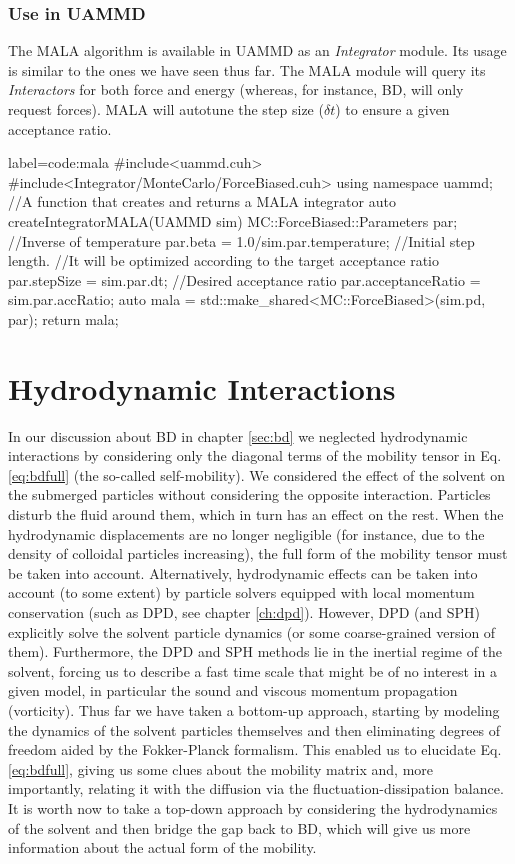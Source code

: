 \documentclass[ twoside,openright,titlepage,numbers=noenddot,%
headinclude,footinclude,cleardoublepage=empty,abstract=on,
BCOR=5mm,paper=b5,fontsize=11pt, dvipsnames
]{scrreprt}
\newcommand{\uammd}{\gls{UAMMD}\xspace}
\newcommand{\dt}{\delta t}
\begin{document}
\subsection*{Use in UAMMD}
The MALA algorithm is available in \uammd as an \emph{Integrator} module. Its usage is similar to the ones we have seen thus far. The MALA module will query its \emph{Interactors} for both force and energy (whereas, for instance, \gls{BD}, will only request forces).
MALA will autotune the step size ($\dt$) to ensure a given acceptance ratio.
\begin{code2}{label=code:mala}
#include<uammd.cuh>
#include<Integrator/MonteCarlo/ForceBiased.cuh>
using namespace uammd;
//A function that creates and returns a MALA integrator
auto createIntegratorMALA(UAMMD sim){   
  MC::ForceBiased::Parameters par;
  //Inverse of temperature
  par.beta = 1.0/sim.par.temperature;	
  //Initial step length.
  //It will be optimized according to the target acceptance ratio
  par.stepSize = sim.par.dt;
  //Desired acceptance ratio 
  par.acceptanceRatio = sim.par.accRatio;
  auto mala = std::make_shared<MC::ForceBiased>(sim.pd, par);
  return mala;
}
\end{code2}

\chapter{Hydrodynamic Interactions}\label{sec:bdhi}
In our discussion about \gls{BD} in chapter \ref{sec:bd} we neglected hydrodynamic interactions by considering only the diagonal terms of the mobility tensor in Eq. \eqref{eq:bdfull} (the so-called self-mobility). We considered the effect of the solvent on the submerged particles without considering the opposite interaction. Particles disturb the fluid around them, which in turn has an effect on the rest. When the hydrodynamic displacements are no longer negligible (for instance, due to the density of colloidal particles increasing), the full form of the mobility tensor must be taken into account. Alternatively, hydrodynamic effects can be taken into account (to some extent) by particle solvers equipped with local momentum conservation (such as \gls{DPD}, see chapter \ref{ch:dpd}). However, \gls{DPD} (and \gls{SPH}) explicitly solve the solvent particle dynamics (or some coarse-grained version of them). Furthermore, the \gls{DPD} and \gls{SPH} methods lie in the inertial regime of the solvent, forcing us to describe a fast time scale that might be of no interest in a given model, in particular the sound and viscous momentum propagation (vorticity). Thus far we have taken a bottom-up approach, starting by modeling the dynamics of the solvent particles themselves and then eliminating degrees of freedom aided by the Fokker-Planck formalism. This enabled us to elucidate Eq. \eqref{eq:bdfull}, giving us some clues about the mobility matrix and, more importantly, relating it with the diffusion via the fluctuation-dissipation balance. It is worth now to take a top-down approach by considering the hydrodynamics of the solvent and then bridge the gap back to \gls{BD}, which will give us more information about the actual form of the mobility.
\end{document}
